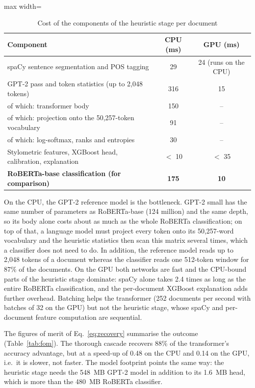 \begin{table}[H]
\caption{Cost of the components of the heuristic stage per document}
\label{tab:profile}
\centering
\small
\begin{adjustbox}{max width=\textwidth}\begin{tabular}{|l|c|c|}
\hline
\textbf{Component} & \textbf{CPU (ms)} & \textbf{GPU (ms)} \\ \hline
spaCy sentence segmentation and POS tagging & 29 & 24 (runs on the CPU) \\ \hline
GPT-2 pass and token statistics (up to 2,048 tokens) & 316 & 15 \\ \hline
\quad of which: transformer body & 150 & -- \\ \hline
\quad of which: projection onto the 50,257-token vocabulary & 91 & -- \\ \hline
\quad of which: log-softmax, ranks and entropies & 30 & -- \\ \hline
Stylometric features, XGBoost head, calibration, explanation & $<$ 10 & $<$ 35 \\ \hline
\textbf{RoBERTa-base classification (for comparison)} & \textbf{175} & \textbf{10} \\ \hline
\end{tabular}\end{adjustbox}
\end{table}

On the CPU, the GPT-2 reference model is the bottleneck. GPT-2 small has the
same number of parameters as RoBERTa-base (124 million) and the same depth, so
its body alone costs about as much as the whole RoBERTa classification; on top
of that, a language model must project every token onto its 50,257-word
vocabulary and the heuristic statistics then scan this matrix several times,
which a classifier does not need to do. In addition, the reference model
reads up to 2,048 tokens of a document whereas the classifier reads one
512-token window for 87\% of the documents. On the GPU both networks are fast
and the CPU-bound parts of the heuristic stage dominate: spaCy alone takes
2.4 times as long as the entire RoBERTa classification, and the
per-document XGBoost explanation adds further overhead. Batching helps the
transformer (252 documents per second with batches of 32 on the GPU) but not the
heuristic stage, whose spaCy and per-document feature computation are
sequential.

The figures of merit of Eq.~\eqref{eq:recovery} summarise the outcome
(Table~\ref{tab:fom}). The thorough cascade recovers 88\% of the transformer's
accuracy advantage, but at a speed-up of 0.48 on the CPU and 0.14 on the GPU,
i.e.\ it is slower, not faster. The model footprint points the same way: the
heuristic stage needs the 548~MB GPT-2 model in addition to its 1.6~MB head,
which is more than the 480~MB RoBERTa classifier.

